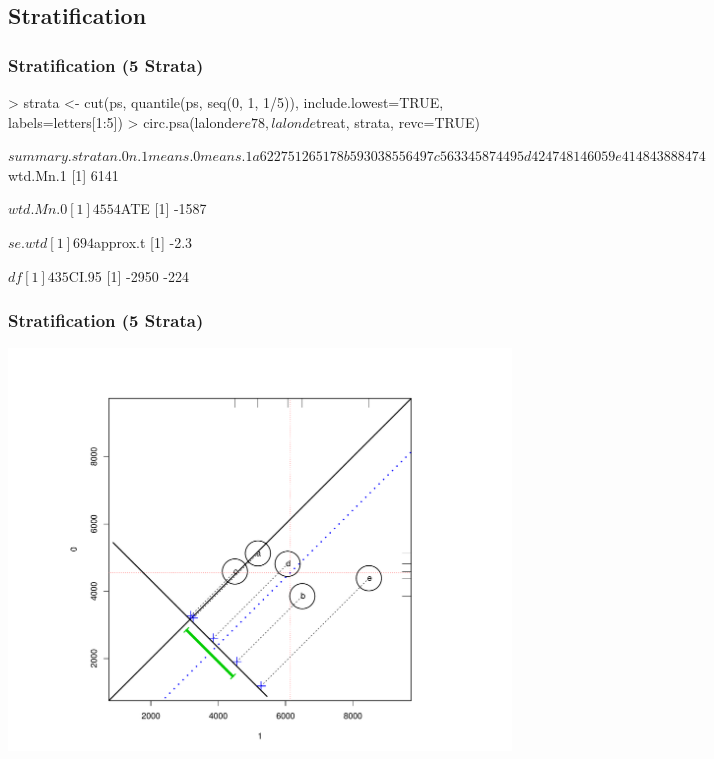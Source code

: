 \documentclass[10pt,slidestop,mathserif,c]{beamer}
\begin{document}
\subsection{Stratification}

\begin{frame}[containsverbatim,fragile,shrink=.8]
    \frametitle{Stratification (5 Strata)}
\begin{Schunk}
\begin{Sinput}
> strata <- cut(ps, quantile(ps, seq(0, 1, 1/5)), include.lowest=TRUE, labels=letters[1:5])
> circ.psa(lalonde$re78, lalonde$treat, strata, revc=TRUE)
\end{Sinput}
\begin{Soutput}
$summary.strata
  n.0 n.1 means.0 means.1
a  62  27    5126    5178
b  59  30    3855    6497
c  56  33    4587    4495
d  42  47    4814    6059
e  41  48    4388    8474

$wtd.Mn.1
[1] 6141

$wtd.Mn.0
[1] 4554

$ATE
[1] -1587

$se.wtd
[1] 694

$approx.t
[1] -2.3

$df
[1] 435

$CI.95
[1] -2950  -224
\end{Soutput}
\end{Schunk}
\end{frame}

\begin{frame}
    \frametitle{Stratification (5 Strata)}
    \begin{center}
        \includegraphics{figures/Slides-circpsa5}
    \end{center}    
\end{frame}
\end{document}

